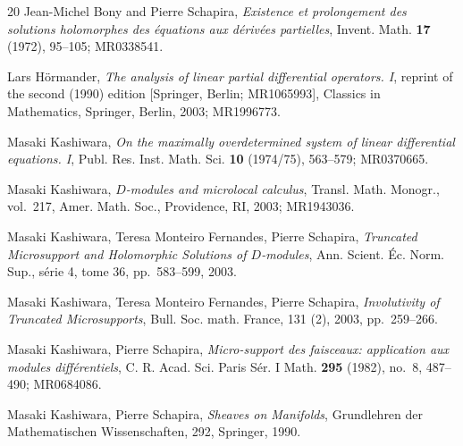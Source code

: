 \begin{thebibliography}{20} 
   Jean-Michel Bony and Pierre Schapira, 
  \textit{Existence et prolongement des solutions holomorphes des \'equations aux d\'eriv\'ees partielles}, 
  Invent. Math. {\bf 17} (1972), 95--105; MR0338541.
  
  
   Lars H\"ormander, 
  \textit{The analysis of linear partial differential operators. I}, 
  reprint of the second (1990) edition [Springer, Berlin; MR1065993], 
  Classics in Mathematics, Springer, Berlin, 2003; MR1996773.
  
   Masaki Kashiwara, 
  \textit{On the maximally overdetermined system of linear differential equations. I}, 
  Publ. Res. Inst. Math. Sci. {\bf 10} (1974/75), 563--579; MR0370665.
  
   Masaki Kashiwara,
  \textit{\(D\)-modules and microlocal calculus},
  Transl. Math. Monogr., vol.~217,
  Amer. Math. Soc., Providence, RI, 2003;
  MR1943036.
  
   Masaki Kashiwara, Teresa Monteiro Fernandes, Pierre Schapira, 
  \textit{Truncated Microsupport and Holomorphic Solutions 
  of \(D\)-modules}, 
  Ann. Scient. \'Ec. Norm. Sup., s\'erie 4, tome 36, 
  pp.~583--599, 2003.
  
   Masaki Kashiwara, Teresa Monteiro Fernandes, Pierre Schapira, 
  \textit{Involutivity of Truncated Microsupports}, 
  Bull. Soc. math. France, 131 (2), 2003, 
  pp.~259--266.
  
   Masaki Kashiwara, Pierre Schapira, 
  \textit{Micro-support des faisceaux: 
  application aux modules diff\'erentiels}, 
  C. R. Acad. Sci. Paris S\'er. I Math. {\bf 295} (1982), 
  no.~8, 487--490; MR0684086.
  
   Masaki Kashiwara, Pierre Schapira, 
  \textit{Sheaves on Manifolds}, 
  Grundlehren der Mathematischen Wissenschaften, 292, Springer, 1990.


\end{thebibliography}
